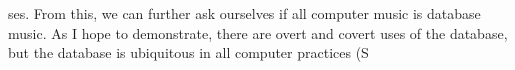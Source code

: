 ses. From this, we can further ask ourselves if all computer music is database music. As I hope to demonstrate, there are overt and covert uses of the database, but the database is ubiquitous in all computer practices (S
% 
% 
% 
% 
%  
% 
% 
%  
%  
% 
% 

